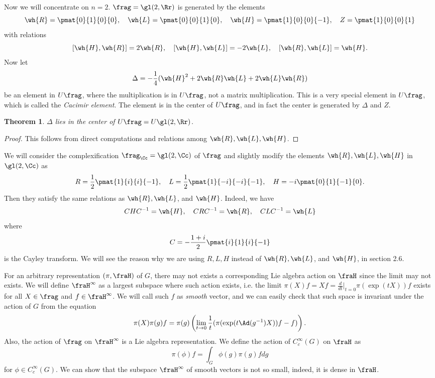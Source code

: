 \documentclass{article}
\newtheorem{theorem}{Theorem}[section]
\begin{document}
Now we will concentrate on $n = 2$. $\frag = \gl(2, \Rr)$ is generated by the elements
$$
\wh{R} = \pmat{0}{1}{0}{0}, \quad \wh{L} = \pmat{0}{0}{1}{0}, \quad \wh{H} = \pmat{1}{0}{0}{-1}, \quad Z = \pmat{1}{0}{0}{1}
$$
with relations 
$$
[\wh{H}, \wh{R}] = 2\wh{R}, \quad [\wh{H}, \wh{L}] = -2\wh{L}, \quad [\wh{R}, \wh{L}] = \wh{H}. 
$$
Now let
$$
\Delta = -\frac{1}{4} ( \wh{H}^{2} + 2\wh{R}\wh{L} + 2\wh{L}\wh{R})
$$
be an element in $U\frag$, where the multiplication is in $U\frag$, not a matrix multiplication. This is a very special element in $U\frag$, which is called the \emph{Cacimir element}. The element is in the center of $U\frag$, and in fact the center is generated by $\Delta$ and $Z$. 
\begin{theorem}
$\Delta$ lies in the center of $U\frag = U\gl(2, \Rr)$. 
\end{theorem}
\begin{proof}
This follows from direct computations and relations among $\wh{R}, \wh{L}, \wh{H}$. 
\end{proof}
We will consider the complexification $\frag_{\Cc} = \gl(2, \Cc)$ of $\frag$ and slightly modify the elements $\wh{R}, \wh{L}, \wh{H}$ in $\gl(2,\Cc)$ as
$$
R = \frac{1}{2} \pmat{1}{i}{i}{-1} , \quad L = \frac{1}{2} \pmat{1}{-i}{-i}{-1}, \quad H = -i\pmat{0}{1}{-1}{0}.
$$
Then they satisfy the same relations as $\wh{R}, \wh{L}$, and $\wh{H}$. Indeed, we have
$$
CHC^{-1} = \wh{H}, \quad CRC^{-1} = \wh{R}, \quad CLC^{-1} = \wh{L}
$$
where 
$$
C = -\frac{1+i}{2} \pmat{i}{1}{i}{-1}
$$
is the Cayley transform. We will see the reason why we are using $R, L, H$ instead of $\wh{R}, \wh{L}$, and $\wh{H}$, in section 2.6. 



For an arbitrary representation $(\pi, \fraH)$ of $G$, there may not exists a corresponding Lie algebra action on $\fraH$ since the limit may not exists. 
We will define $\fraH^{\infty}$ as a largest subspace where such action exists, i.e. the limit $\pi(X)f = Xf = \frac{d}{dt}|_{t=0} \pi(\exp(tX)) f$ exists for all $X\in \frag$ and $f \in \fraH^{\infty}$. We will call such $f$ as \emph{smooth} vector, and we can easily check that such space is invariant under the action of $G$ from the equation
$$
\pi(X)\pi(g)f = \pi(g)\left( \lim_{t\to 0} \frac{1}{t} (\pi(\exp( t\Ad(g^{-1})X))f - f)\right).
$$  
Also, the action of $\frag$ on $\fraH^{\infty}$ is a Lie algebra representation. 
We define the action of $C^{\infty}_{c}(G)$ on $\fraH$ as 
$$
\pi(\phi)f = \int_{G} \phi(g)\pi(g)f dg
$$
for $\phi\in C_{c}^{\infty}(G)$. We can show that the subspace $\fraH^{\infty}$ of smooth vectors is not so small, indeed, it is dense in $\fraH$. 
\end{document}
